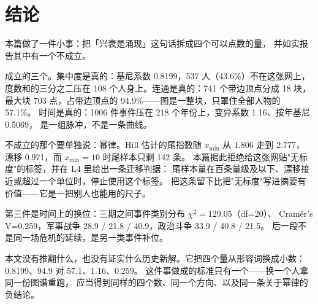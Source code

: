 \section{结论}

本篇做了一件小事：把「兴衰是涌现」这句话拆成四个可以点数的量，
并如实报告其中有一个不成立。

成立的三个。集中度是真的：基尼系数 0.8199，537 人（43.6\%）不在这张网上，
度数和的三分之二压在 108 个人身上。连通是真的：741 个带边顶点分成 18 块，
最大块 703 点，占带边顶点的 94.9\%——图是一整块，只罩住全部人物的 57.1\%。
时间是真的：1006 件事件压在 218 个年份上，变异系数 1.16、按年基尼 0.5069，
是一组脉冲，不是一条曲线。

不成立的那个要单独说：幂律。Hill 估计的尾指数随 $x_{\min}$ 从 1.806 走到 2.777，
漂移 0.971，而 $x_{\min}=10$ 时尾样本只剩 142 条。
本篇据此拒绝给这张网贴"无标度"的标签，并在 L4 里给出一条迁移判据：
尾样本量在百条量级及以下、漂移接近或超过一个单位时，停止使用这个标签。
把这条留下比把"无标度"写进摘要有价值——它是一把别人也能用的尺子。

第三件是时间上的换位：三期之间事件类别分布 $\chi^{2}=129.05$（df=20）、
Cramér's V=0.259，军事战争 28.9 / 21.8 / 40.9，政治斗争 33.9 / 40.8 / 21.5。
后一段不是同一场危机的延续，是另一类事件补位。

本文没有推翻什么，也没有证实什么历史新解。它把四个量从形容词换成小数：
0.8199、94.9 对 57.1、1.16、0.259。
这件事做成的标准只有一个——换一个人拿同一份图谱重跑，
应当得到同样的四个数、同一个方向、以及同一条关于幂律的负结论。
